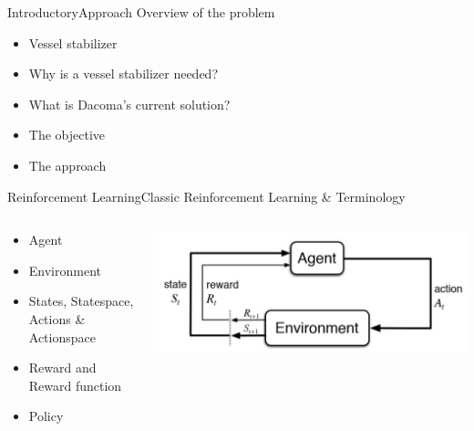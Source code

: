 \documentclass{beamer}
\begin{document}
\begin{frame}{Introductory}{Approach\vphantom{(y}}
\vspace{-0.7em}
Overview of the problem
\begin{itemize}
\item Vessel stabilizer
\item Why is a vessel stabilizer needed?
\item What is Dacoma's current solution?
\item The objective
\item {\color{blue}The approach}
\end{itemize}
\end{frame}



\begin{frame}{Reinforcement Learning}{Classic Reinforcement Learning \& Terminology\vphantom{(y}}
\vspace{-0.7em}

\begin{columns}
    \begin{column}{0.48\textwidth}
      \begin{itemize}
      \item Agent
      \item Environment
      \item States, Statespace, Actions \& Actionspace
      \item Reward and Reward function
      \item Policy
      \end{itemize}
    \end{column}
    \begin{column}{0.48\textwidth}
        \includegraphics[width=1\textwidth]{images/rl_explained.jpg}
    \end{column}
\end{columns}
\end{frame}
\end{document}
